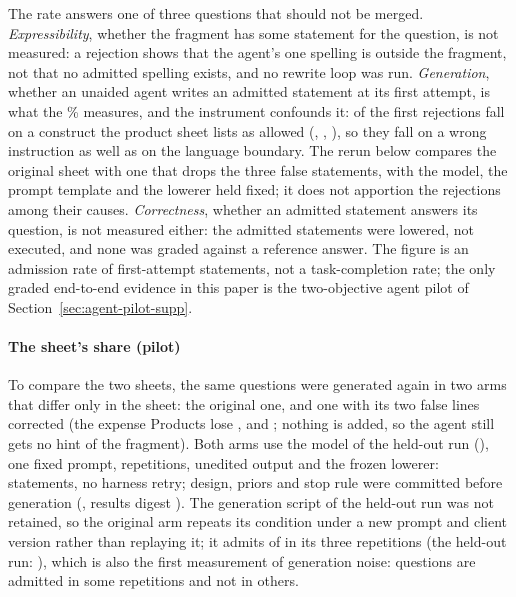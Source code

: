 \documentclass[journal,onecolumn]{IEEEtran}
\newcommand{\code}[1]{\texttt{\detokenize{#1}}}
\begin{document}
The rate answers one of three questions that should not be merged.
\emph{Expressibility}, whether the fragment has some statement for the
question, is not measured: a rejection shows that the agent's one spelling is
outside the fragment, not that no admitted spelling exists, and no rewrite
loop was run. \emph{Generation}, whether an unaided agent writes an admitted
statement at its first attempt, is what the \HeldoutLowerablePct\% measures,
and the instrument confounds it: \HeldoutSheetAdvertised{} of the
\HeldoutRejected{} first rejections fall on a construct the product sheet
lists as allowed (\code{to_char}, \code{date_trunc}, \code{/}), so they
fall on a wrong instruction as well as on the language boundary. The rerun
below compares the original sheet with one that drops the three false
statements, with the model, the prompt template and the lowerer held fixed;
it does not apportion the rejections among their causes. \emph{Correctness},
whether an admitted statement answers its question, is not measured either:
the \HeldoutLowerable{} admitted statements were lowered, not executed, and
none was graded against a reference answer. The figure is an admission rate
of first-attempt statements, not a task-completion rate; the only graded
end-to-end evidence in this paper is the two-objective agent pilot of
Section~\ref{sec:agent-pilot-supp}.

\paragraph{The sheet's share (pilot)}
To compare the two sheets, the same \HeldoutQueries{} questions
were generated again in two arms that differ only in the sheet: the original
one, and one with its two false lines corrected (the expense Products lose
\code{date_trunc}, \code{to_char} and \code{/}; nothing is added, so the
agent still gets no hint of the fragment). Both arms use the model of the
held-out run (\SheetModel{}), one fixed prompt, \SheetReps{} repetitions,
unedited output and the frozen lowerer: \SheetStatements{} statements, no
harness retry; design, priors and stop rule were committed before generation
(, results digest
\SheetResultsDigest{}). The generation script of the held-out run was not
retained, so the original arm repeats its condition under a new prompt and
client version rather than replaying it; it admits \SheetOriginalAdmitted{}
of \HeldoutQueries{} in its three repetitions (the held-out run:
\HeldoutLowerable{}), which is also the first measurement of generation
noise: \SheetOriginalUnstable{} questions are admitted in some repetitions
and not in others.
\end{document}
